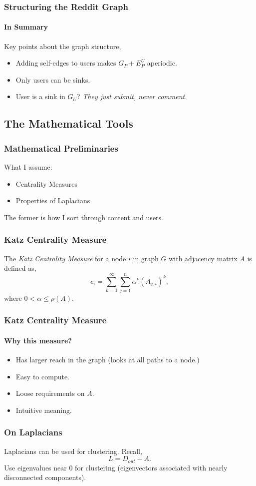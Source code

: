 \documentclass[frame number]{beamer}
\begin{document}
\begin{frame}
  \frametitle{Structuring the Reddit Graph}
  \framesubtitle{In Summary}
  Key points about the graph structure,
  \begin{itemize}
    \item<2->{Adding self-edges to users makes \(G_P + E_P^U\) aperiodic.}
    \item<3->{Only users can be sinks.}
    \item<4->{User is a sink in \(G_U\)? \emph{They just submit, never comment.}}
  \end{itemize}
\end{frame}

\subsection{The Mathematical Tools}
\begin{frame}
  \frametitle{Mathematical Preliminaries}
  What I assume:
  \begin{itemize}
    \item{Centrality Measures}
    \item{Properties of Laplacians}
  \end{itemize}
  The former is how I sort through content and users.
\end{frame}
\begin{frame}
  \frametitle{Katz Centrality Measure}
  \begin{definition}
    The \emph{Katz Centrality Measure} for a node \(i\) in graph \(G\) with adjacency matrix \(A\) is defined as,
    \[
      c_i = \sum_{k=1}^\infty \sum_{j=1}^n \alpha^k \left( A_{j,i} \right)^k,
    \]
    where \(0 < \alpha \leq \rho(A).\)
  \end{definition}
\end{frame}
\begin{frame}
  \frametitle{Katz Centrality Measure}
  \framesubtitle{Why this measure?}
  \begin{itemize}
    \item{Has larger reach in the graph (looks at all paths to a node.)}
    \item{Easy to compute.}
    \item{Loose requirements on \(A.\)}
    \item{Intuitive meaning.}
  \end{itemize}
\end{frame}
\begin{frame}
  \frametitle{On Laplacians}
  Laplacians can be used for clustering. Recall,
  \[
    L = D_{out} - A.
  \]
  Use eigenvalues near 0 for clustering (eigenvectors associated with nearly disconnected components).
\end{frame}
\end{document}
